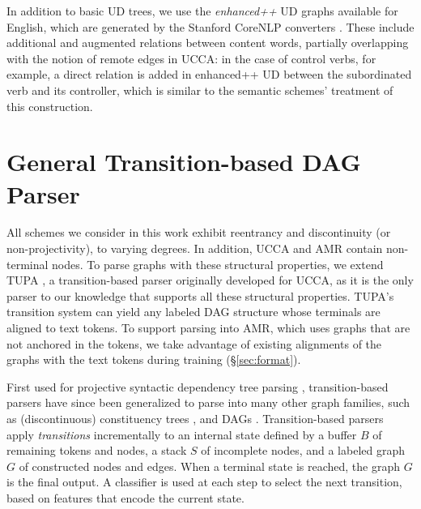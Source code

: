 \documentclass[11pt,a4paper]{article}
\begin{document}
In addition to basic UD trees, we use the \textit{enhanced++} UD graphs available for English,
which are generated by the Stanford CoreNLP converters \cite{SCHUSTER16.779}.
These include additional and augmented relations between content words,
partially overlapping with the notion of remote edges in UCCA:
in the case of control verbs, for example, a direct relation is added in 
enhanced++ UD between the subordinated verb and its controller,
which is similar to the semantic schemes' treatment of this construction.


\section{General Transition-based DAG Parser}\label{sec:model}

All schemes we consider in this work exhibit
reentrancy and discontinuity (or non-projectivity), to varying degrees.
In addition, UCCA and AMR contain non-terminal nodes.
To parse graphs with these structural properties,
we extend TUPA \cite[henceforth HAR17]{hershcovich2017a}, 
a transition-based parser 
originally developed for UCCA,
as it is the only parser to our knowledge that supports 
all these structural properties.
TUPA's transition system can yield any labeled DAG structure
whose terminals are aligned to text tokens.
To support parsing into AMR, which uses graphs that are not anchored in the tokens,
 we take advantage of existing alignments of the graphs with the text
tokens during training (\S\ref{sec:format}).

First used for projective syntactic dependency tree parsing \cite{Nivre03anefficient},
transition-based parsers have since been generalized to parse into many other
graph families, such as (discontinuous) constituency trees \cite[e.g., ][]{zhang2009transition,maier-lichte:2016:DiscoNLP},
and DAGs \cite[e.g.,][]{sagae2008shift,du-EtAl:2015:SemEval}. %
Transition-based parsers apply \textit{transitions}
incrementally to an internal state defined by a buffer $B$ of remaining tokens 
and nodes, a stack $S$ of incomplete nodes, and a labeled graph $G$ of 
constructed nodes and edges.
When a terminal state is reached, the graph $G$ is the final output.
A classifier is used at each step to select the next transition, 
based on features that encode the current state.
\end{document}
